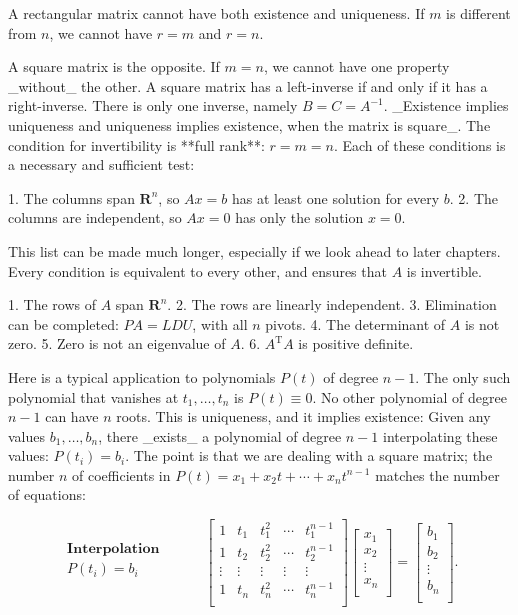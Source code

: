 A rectangular matrix cannot have both existence and uniqueness. If \(m\) is different from \(n\), we cannot have \(r=m\) and \(r=n\).

A square matrix is the opposite. If \(m=n\), we cannot have one property _without_ the other. A square matrix has a left-inverse if and only if it has a right-inverse. There is only one inverse, namely \(B=C=A^{-1}\). _Existence implies uniqueness and uniqueness implies existence, when the matrix is square_. The condition for invertibility is **full rank**: \(r=m=n\). Each of these conditions is a necessary and sufficient test:

1. The columns span \(\mathbf{R}^{n}\), so \(Ax=b\) has at least one solution for every \(b\).
2. The columns are independent, so \(Ax=0\) has only the solution \(x=0\).

This list can be made much longer, especially if we look ahead to later chapters. Every condition is equivalent to every other, and ensures that \(A\) is invertible.

1. The rows of \(A\) span \(\mathbf{R}^{n}\).
2. The rows are linearly independent.
3. Elimination can be completed: \(PA=LDU\), with all \(n\) pivots.
4. The determinant of \(A\) is not zero.
5. Zero is not an eigenvalue of \(A\).
6. \(A^{\mathrm{T}}A\) is positive definite.

Here is a typical application to polynomials \(P(t)\) of degree \(n-1\). The only such polynomial that vanishes at \(t_{1},\ldots,t_{n}\) is \(P(t)\equiv 0\). No other polynomial of degree \(n-1\) can have \(n\) roots. This is uniqueness, and it implies existence: Given any values \(b_{1},\ldots,b_{n}\), there _exists_ a polynomial of degree \(n-1\) interpolating these values: \(P(t_{i})=b_{i}\). The point is that we are dealing with a square matrix; the number \(n\) of coefficients in \(P(t)=x_{1}+x_{2}t+\cdots+x_{n}t^{n-1}\) matches the number of equations:

\[\begin{array}{ccccc}\textbf{Interpolation}&\\ P(t_{i})=b_{i}&\\ \end{array}\qquad\begin{bmatrix}1&t_{1}&t_{1}^{2}&\cdots&t_{1}^{n-1}\\ 1&t_{2}&t_{2}^{2}&\cdots&t_{2}^{n-1}\\ \vdots&\vdots&\vdots&\vdots&\vdots\\ 1&t_{n}&t_{n}^{2}&\cdots&t_{n}^{n-1}\\ \end{bmatrix}\begin{bmatrix}x_{1}\\ x_{2}\\ \vdots\\ x_{n}\\ \end{bmatrix}=\begin{bmatrix}b_{1}\\ b_{2}\\ \vdots\\ b_{n}\\ \end{bmatrix}.\]

